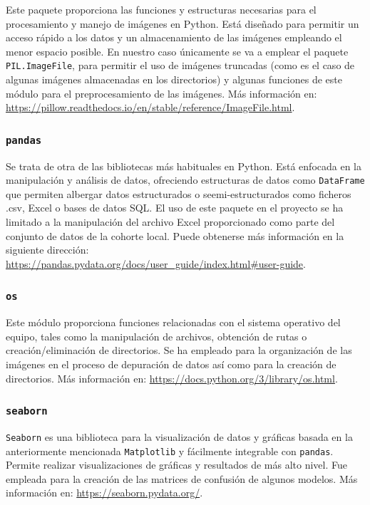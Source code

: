 Este paquete proporciona las funciones y estructuras necesarias para el procesamiento y manejo de imágenes en Python. Está diseñado para permitir un acceso rápido a los datos y un almacenamiento de las imágenes empleando el menor espacio posible. En nuestro caso únicamente se va a emplear el paquete \texttt{PIL.ImageFile}, para permitir el uso de imágenes truncadas (como es el caso de algunas imágenes almacenadas en los directorios) y algunas funciones de este módulo para el preprocesamiento de las imágenes. Más información en: \url{https://pillow.readthedocs.io/en/stable/reference/ImageFile.html}.

\subsubsection{\texttt{pandas}}

Se trata de otra de las bibliotecas más habituales en Python. Está enfocada en la manipulación y análisis de datos, ofreciendo estructuras de datos como \texttt{DataFrame} que permiten albergar datos estructurados o seemi-estructurados como ficheros .csv, Excel o bases de datos SQL. El uso de este paquete en el proyecto se ha limitado a la manipulación del archivo Excel proporcionado como parte del conjunto de datos de la cohorte local. Puede obtenerse más información en la siguiente dirección: \url{https://pandas.pydata.org/docs/user_guide/index.html#user-guide}.

\subsubsection{\texttt{os}}

Este módulo proporciona funciones relacionadas con el sistema operativo del equipo, tales como la manipulación de archivos, obtención de rutas o creación/eliminación de directorios. Se ha empleado para la organización de las imágenes en el proceso de depuración de datos así como para la creación de directorios. Más información en: \url{https://docs.python.org/3/library/os.html}.

\subsubsection{\texttt{seaborn}}

\texttt{Seaborn} es una biblioteca para la visualización de datos y gráficas basada en la anteriormente mencionada \texttt{Matplotlib} y fácilmente integrable con \texttt{pandas}. Permite realizar visualizaciones de gráficas y resultados de más alto nivel. Fue empleada para la creación de las matrices de confusión de algunos modelos. Más información en: \url{https://seaborn.pydata.org/}.

